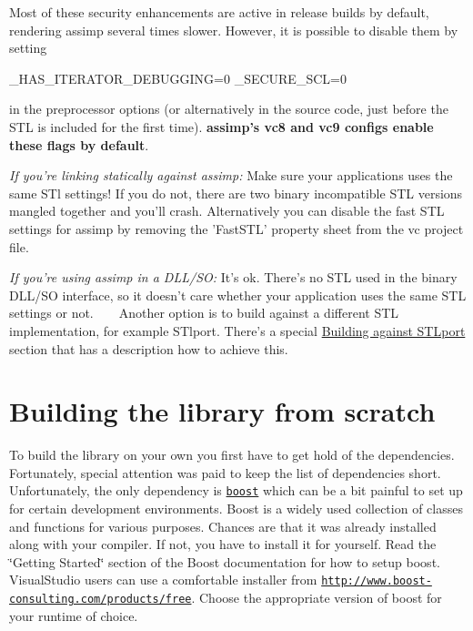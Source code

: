 Most of these security enhancements are active in release builds by default, rendering assimp several times slower. However, it is possible to disable them by setting


\begin{DoxyCode}
\_HAS\_ITERATOR\_DEBUGGING=0
\_SECURE\_SCL=0
\end{DoxyCode}


in the preprocessor options (or alternatively in the source code, just before the S\+T\+L is included for the first time). {\bfseries assimp's vc8 and vc9 configs enable these flags by default}.

{\itshape If you're linking statically against assimp\+:} Make sure your applications uses the same S\+Tl settings! If you do not, there are two binary incompatible S\+T\+L versions mangled together and you'll crash. Alternatively you can disable the fast S\+T\+L settings for assimp by removing the 'Fast\+S\+T\+L' property sheet from the vc project file.

{\itshape If you're using assimp in a D\+L\+L/\+S\+O\+:} It's ok. There's no S\+T\+L used in the binary D\+L\+L/\+S\+O interface, so it doesn't care whether your application uses the same S\+T\+L settings or not. ~\newline
~\newline
 Another option is to build against a different S\+T\+L implementation, for example S\+Tlport. There's a special \hyperlink{install_assimp_stlport}{Building against S\+T\+Lport} section that has a description how to achieve this.\hypertarget{install_install_own}{}\section{Building the library from scratch}\label{install_install_own}
To build the library on your own you first have to get hold of the dependencies. Fortunately, special attention was paid to keep the list of dependencies short. Unfortunately, the only dependency is \href{http://www.boost.org}{\tt boost} which can be a bit painful to set up for certain development environments. Boost is a widely used collection of classes and functions for various purposes. Chances are that it was already installed along with your compiler. If not, you have to install it for yourself. Read the \char`\"{}\+Getting Started\char`\"{} section of the Boost documentation for how to setup boost. Visual\+Studio users can use a comfortable installer from \href{http://www.boost-consulting.com/products/free}{\tt http\+://www.\+boost-\/consulting.\+com/products/free}. Choose the appropriate version of boost for your runtime of choice.

